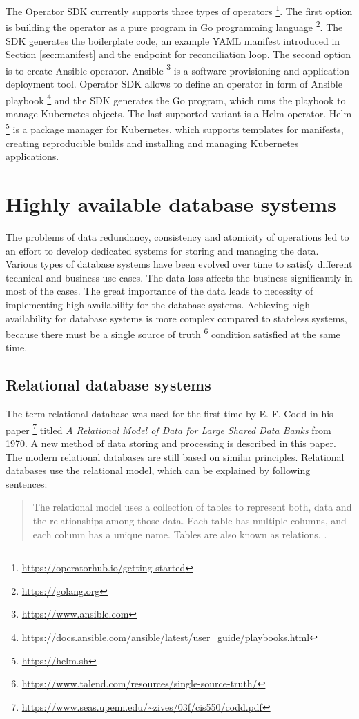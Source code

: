 \documentclass[
  digital, %
  twoside, %
  table,   %
  lof,     %
  lot,     %
]{fithesis3}
\begin{document}
The Operator SDK currently supports three types of operators \footnote{\url{https://operatorhub.io/getting-started}}. The first option is building the operator as a pure program in Go programming language \footnote{\url{https://golang.org}}. The SDK generates the boilerplate code, an example YAML manifest introduced in Section \ref{sec:manifest} and the endpoint for reconciliation loop. The second option is to create Ansible operator. Ansible \footnote{\url{https://www.ansible.com}} is a software provisioning and application deployment tool. Operator SDK allows to define an operator in form of Ansible playbook \footnote{\url{https://docs.ansible.com/ansible/latest/user_guide/playbooks.html}} and the SDK generates the Go program, which runs the playbook to manage Kubernetes objects. The last supported variant is a Helm operator. Helm \footnote{\url{https://helm.sh}} is a package manager for Kubernetes, which supports templates for manifests, creating reproducible builds and installing and managing Kubernetes applications.

\chapter{Highly available database systems} \label{chap:ha_database_systems}
The problems of data redundancy, consistency and atomicity of operations led to an effort to develop dedicated systems for storing and managing the data. Various types of database systems have been evolved over time to satisfy different technical and business use cases. The data loss affects the business significantly in most of the cases. The great importance of the data leads to necessity of implementing high availability for the database systems. Achieving high availability for database systems is more complex compared to stateless systems, because there must be a single source of truth \footnote{\url{https://www.talend.com/resources/single-source-truth/}} condition satisfied at the same time.

\section{Relational database systems}
The term relational database was used for the first time by E. F. Codd in his paper \footnote{\url{https://www.seas.upenn.edu/~zives/03f/cis550/codd.pdf}} titled \textit{A Relational Model of Data for Large Shared Data Banks} from 1970. A new method of data storing and processing is described in this paper. The modern relational databases are still based on similar principles. Relational databases use the relational model, which can be explained by following sentences:
\begin{quote}
The relational model uses a collection of tables to represent both, data and the relationships among those data. Each table has multiple columns, and each column has a unique name. Tables are also known as relations. \cite[p. 9]{db}.
\end{quote}
\end{document}
